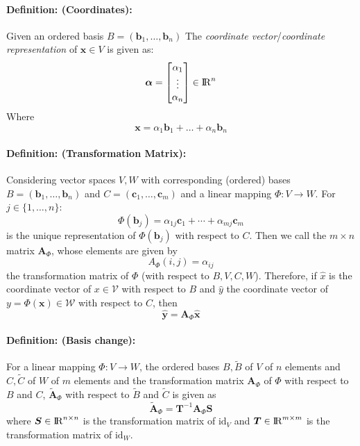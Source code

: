 \documentclass[12pt]{article}
\newcommand{\R}{{\rm I\!R}}
\newcommand{\A}{{\bm{A}}}
\newcommand{\vecs}[2]{{\bm{#1}_1, \dots, \bm{#1}_#2}}
\newcommand{\xdefinition}[2]{\paragraph{\colorbox{#1!30}{\textbf{Definition:}} (#2):}}
\newcommand{\mc}[1]{\mathcal{#1}}
\begin{document}
\xdefinition{green}{Coordinates} Given an ordered basis $B = (\vecs{b}{n})$ The \textit{coordinate vector}/\textit{coordinate representation} of $\bm{x} \in V$ is given as:
%
\begin{equation}
	\bm{\alpha} = \begin{bmatrix}
		\alpha_1 \\
		\vdots \\
		\alpha_n
	\end{bmatrix} \in \R^n
\end{equation}
%
Where
%
\begin{equation}
	\bm{x} = \alpha_1 \bm{b}_1 + \dots + \alpha_n \bm{b}_n
\end{equation}

\xdefinition{blue}{Transformation Matrix} Considering vector spaces $V, W$ with corresponding (ordered) bases $B = (\vecs{b}{n})$ and $C = (\vecs{c}{m})$ and a linear mapping $\Phi : V \rightarrow W$. For $j \in \{1, \dots, n\}$:
%
\begin{equation}
	\Phi(\bm{b}_j) = \alpha_{1j} \bm{c}_1 + \cdots + \alpha_{mj} \bm{c}_m
\end{equation}
%
is the unique representation of $\Phi(\bm{b}_j)$ with respect to $C$. Then we call the $m \times n$ matrix $\A_\Phi$, whose elements are given by
%
\begin{equation}
	A_\Phi(i, j) = \alpha_{ij}
\end{equation}
%
the transformation matrix of $\Phi$ (with respect to $B, V, C, W$). Therefore, if $\hat{x}$ is the coordinate vector of $x \in \mc{V}$ with respect to $B$ and $\hat{y}$ the coordinate vector of $y = \Phi(\bm{x}) \in \mc{W}$ with respect to $C$, then
%
\begin{equation}
	\hat{\bm{y}} = \A_\Phi \hat{\bm{x}}
\end{equation}

\xdefinition{black}{Basis change} For a linear mapping $\Phi : V \rightarrow W$, the ordered bases $B, \tilde{B}$ of $V$ of $n$ elements and $C, \tilde{C}$ of $W$ of $m$ elements and the transformation matrix $\A_\Phi$ of $\Phi$ with respect to $B$ and $C$, $\tilde{\A}_\Phi$ with respect to $\tilde{B}$ and $\tilde{C}$ is given as
%
\begin{equation}
	\tilde{\A}_\Phi = \bm{T}^{-1} \A_\Phi \bm{S}
\end{equation}
%
where $\bm{S} \in \R^{n \times n}$ is the transformation matrix of $\text{id}_V$ and $\bm{T} \in \R^{m \times m}$ is the transformation matrix of $\text{id}_W$.
\end{document}
